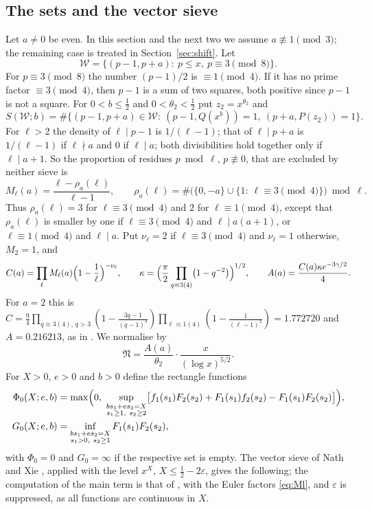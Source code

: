 \documentclass[11pt,a4paper]{amsart}
\theoremstyle{remark}
\numberwithin{equation}{section}
\newcommand{\cW}{\mathcal W}
\newcommand{\cN}{\mathfrak N}
\begin{document}
\subsection{The sets and the vector sieve}
Let $a\ne0$ be even. In this section and the next two we assume $a\not\equiv1\pmod 3$; the remaining case is
treated in Section~\ref{sec:shift}. Let
\[
\cW=\{(p-1,p+a):\ p\le x,\ p\equiv3\!\!\pmod 8\}.
\]
For $p\equiv3\pmod 8$ the number $(p-1)/2$ is $\equiv1\pmod 4$. If it has no prime factor $\equiv3\pmod 4$, then
$p-1$ is a sum of two squares, both positive since $p-1$ is not a square. For $0<b\le\frac12$ and
$0<\theta_2<\frac12$ put $z_2=x^{\theta_2}$ and
\[
S(\cW;b)=\#\{(p-1,p+a)\in\cW:\ (p-1,Q(x^b))=1,\ (p+a,P(z_2))=1\}.
\]
For $\ell>2$ the density of $\ell\mid p-1$ is $1/(\ell-1)$; that of $\ell\mid p+a$ is $1/(\ell-1)$ if $\ell\nmid a$
and $0$ if $\ell\mid a$; both divisibilities hold together only if $\ell\mid a+1$. So the proportion of residues
$p\bmod\ell$, $p\not\equiv0$, that are excluded by neither sieve is
\begin{equation}\label{eq:Ml}
M_\ell(a)=\frac{\ell-\rho_a(\ell)}{\ell-1},\qquad
\rho_a(\ell)=\#\bigl(\{0,-a\}\cup\{1:\ \ell\equiv3\!\!\!\pmod 4\}\bigr)\bmod\ell .
\end{equation}
Thus $\rho_a(\ell)=3$ for $\ell\equiv3\pmod 4$ and $2$ for $\ell\equiv1\pmod4$, except that $\rho_a(\ell)$ is
smaller by one if $\ell\equiv3\pmod 4$ and $\ell\mid a(a+1)$, or $\ell\equiv1\pmod4$ and $\ell\mid a$. Put
$\nu_\ell=2$ if $\ell\equiv3\pmod4$ and $\nu_\ell=1$ otherwise, $M_2=1$, and
\begin{equation}\label{eq:A}
C(a)=\prod_{\ell}M_\ell(a)\Bigl(1-\frac1\ell\Bigr)^{-\nu_\ell},\qquad
\kappa=\Bigl(\frac\pi2\prod_{q\equiv3(4)}\bigl(1-q^{-2}\bigr)\Bigr)^{1/2},\qquad
A(a)=\frac{C(a)\kappa e^{-3\gamma/2}}4 .
\end{equation}
For $a=2$ this is $C=\frac94\prod_{q\equiv3(4),\,q>3}(1-\frac{3q-1}{(q-1)^3})\prod_{\ell\equiv1(4)}(1-\frac1{(\ell-1)^2})=1.772720$
and $A=0.216213$, as in \cite{NX}. We normalise by
\[
\cN=\frac{A(a)}{\theta_2}\cdot\frac{x}{(\log x)^{5/2}} .
\]
For $X>0$, $e>0$ and $b>0$ define the rectangle functions
\begin{align}
\Phi_0(X;e,b)&=\max\Bigl(0,\ \sup_{\substack{bs_1+es_2=X\\ s_1\ge1,\ s_2\ge2}}
\bigl[f_1(s_1)F_2(s_2)+F_1(s_1)f_2(s_2)-F_1(s_1)F_2(s_2)\bigr]\Bigr),\label{eq:Phi0}\\
G_0(X;e,b)&=\inf_{\substack{bs_1+es_2=X\\ s_1>0,\ s_2\ge1}}F_1(s_1)F_2(s_2),\label{eq:G0}
\end{align}
with $\Phi_0=0$ and $G_0=\infty$ if the respective set is empty. The vector sieve of Nath and Xie
\cite[Proposition~3.10]{NX}, applied with the level $x^{X}$, $X\le\frac12-2\varepsilon$, gives the following;
the computation of the main term is that of \cite[Proposition~4.1]{NX}, with the Euler factors \eqref{eq:Ml}, and
$\varepsilon$ is suppressed, as all functions are continuous in $X$.
\end{document}
